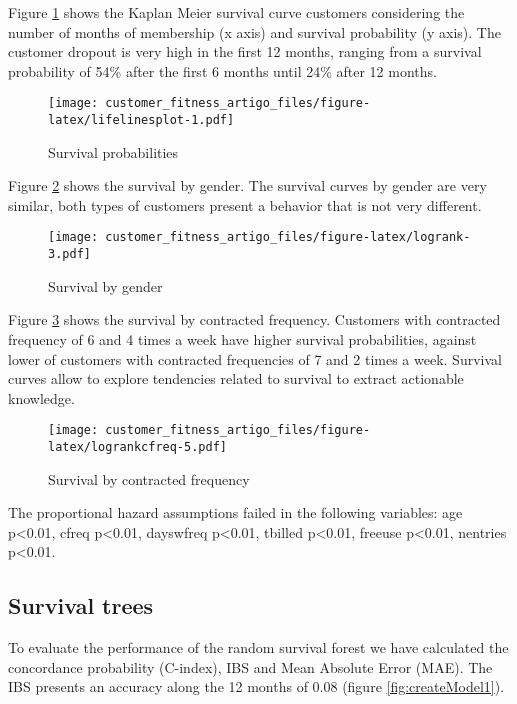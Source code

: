 \documentclass[
  12pt,
]{article}
\begin{document}
Figure \ref{fig:lifelinesplot} shows the Kaplan Meier survival curve customers
considering the number of months of membership (x axis) and survival probability
(y axis).
The customer dropout is very high in the first 12 months, ranging from a survival
probability of 54\% after the first 6 months until 24\% after 12 months.

\begin{figure}
\centering
\texttt{[image: customer\_fitness\_artigo\_files/figure-latex/lifelinesplot-1.pdf]}
\caption{\label{fig:lifelinesplot}Survival probabilities}
\end{figure}

Figure \ref{fig:logrank} shows the survival by gender.
The survival curves by gender are very similar, both types of
customers present a behavior that is not very different.

\begin{figure}
\centering
\texttt{[image: customer\_fitness\_artigo\_files/figure-latex/logrank-3.pdf]}
\caption{\label{fig:logrank}Survival by gender}
\end{figure}

Figure \ref{fig:logrankcfreq} shows the survival by contracted frequency.
Customers with contracted frequency of 6 and 4 times a week have higher survival
probabilities, against lower of customers with contracted frequencies of 7 and
2 times a week.
Survival curves allow to explore tendencies related to survival to extract
actionable knowledge.

\begin{figure}
\centering
\texttt{[image: customer\_fitness\_artigo\_files/figure-latex/logrankcfreq-5.pdf]}
\caption{\label{fig:logrankcfreq}Survival by contracted frequency}
\end{figure}

The proportional hazard assumptions failed in the following variables:
age p\textless0.01, cfreq p\textless0.01, dayswfreq p\textless0.01, tbilled p\textless0.01, freeuse
p\textless0.01, nentries p\textless0.01.

\hypertarget{survival-trees-1}{%
\subsection{Survival trees}\label{survival-trees-1}}

To evaluate the performance of the random survival forest we have calculated
the concordance probability (C-index), IBS and Mean Absolute Error (MAE).
The IBS presents an accuracy along the 12 months of 0.08 (figure \ref{fig:createModel1}).
\end{document}
